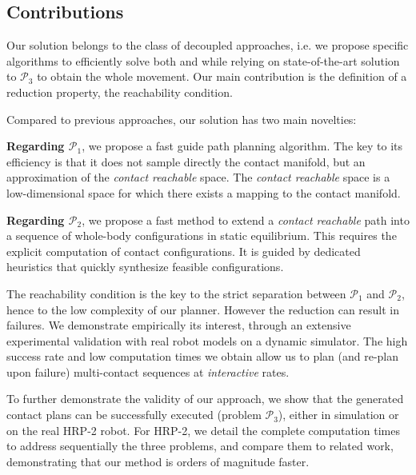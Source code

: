 \documentclass[journal]{IEEEtran}
\newcommand{\gls}[1]{\textit{#1}}
\providecommand{\DIFaddtex}[1]{#1} %
\providecommand{\DIFdeltex}[1]{} %
\providecommand{\DIFaddbegin}{\protect\color{blue}} %
\providecommand{\DIFaddend}{\protect\color{black}} %
\providecommand{\DIFdelbegin}{\protect\cbdelete} %
\providecommand{\DIFdelend}{} %
\providecommand{\DIFadd}[1]{\texorpdfstring{\DIFaddtex{#1}}{#1}} %
\providecommand{\DIFdel}[1]{\texorpdfstring{\DIFdeltex{#1}}{}} %
\begin{document}
\subsection{Contributions}

Our solution belongs to the class of decoupled approaches, 
i.e. 
we
propose
specific
algorithms
to
efficiently
solve
both
\Pa
and \Pb
while 
relying 
on 
state-of-the-art 
solution 
to 
$\mathcal{P}_3$
to 
obtain
the
whole
movement.
Our
main
contribution
is
the
definition        
of
a reduction property, the reachability condition.

Compared to previous approaches, our solution has two main novelties: 

\noindent \textbf{Regarding $\mathcal{P}_1$}\DIFdelbegin \DIFdel{. We }\DIFdelend \DIFaddbegin \DIFadd{, we }\DIFaddend propose a fast guide path planning algorithm. The key to its efficiency is that it does not sample directly the contact manifold, but an approximation of the \textit{contact reachable} space. The \textit{contact reachable} space is a low-dimensional space for which there exists a mapping to the contact manifold.

\noindent \textbf{Regarding $\mathcal{P}_2$},  we propose a fast method to extend a \textit{contact reachable} path into a sequence of whole-body configurations in static equilibrium. This  requires the explicit computation of contact configurations. It is guided by dedicated heuristics that quickly synthesize feasible configurations.

The reachability condition is the key to the strict separation between $\mathcal{P}_1$ and $\mathcal{P}_2$, hence to the low complexity of our planner\DIFdelbegin \DIFdel{, though it
}\DIFdelend \DIFaddbegin \DIFadd{. However the reduction
}\DIFaddend can result in failures. \DIFdelbegin \DIFdel{However, we }\DIFdelend \DIFaddbegin \DIFadd{We }\DIFaddend demonstrate empirically its interest\DIFdelbegin \DIFdel{: the }\DIFdelend \DIFaddbegin \DIFadd{, through an extensive experimental validation with real robot models on a dynamic simulator. The }\DIFaddend high success rate and low computation times \DIFaddbegin \DIFadd{we obtain }\DIFaddend allow us to plan (and re-plan upon failure) multi-contact sequences at \gls{interactive} rates.

To further demonstrate the validity of our approach, we show that the generated contact plans  can be successfully executed (problem  $\mathcal{P}_3$), either in simulation or on the real HRP-2 robot. For HRP-2, we detail the complete computation times to address sequentially the three problems, and compare them to related work, demonstrating that our method is orders of magnitude faster.
\end{document}
